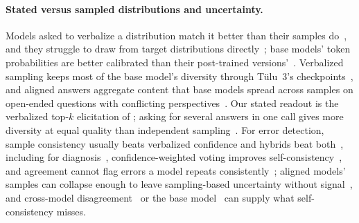 \documentclass[wcp]{jmlr}
\begin{document}
\paragraph{Stated versus sampled distributions and uncertainty.}
Models asked to verbalize a distribution match it better than their samples do~\citep{meister2025distributional,jang2026cannotsample}, and they struggle to draw from target distributions directly~\citep{gu2026illusion,zhao2026dice,zhang2024diffuse}; base models' token probabilities are better calibrated than their post-trained versions'~\citep{kadavath2022know}. Verbalized sampling keeps most of the base model's diversity through Tülu~3's checkpoints~\citep{zhang2025verbalized}, and aligned answers aggregate content that base models spread across samples on open-ended questions with conflicting perspectives~\citep{lake2025overton}. Our stated readout is the verbalized top-$k$ elicitation of \citet{tian2023justask}; asking for several answers in one call gives more diversity at equal quality than independent sampling~\citep{troshin2025asking}. For error detection, sample consistency usually beats verbalized confidence and hybrids beat both~\citep{xiong2024express,lyu2024consistency}, including for diagnosis~\citep{savage2025uncertainty,ren2026medconf}, confidence-weighted voting improves self-consistency~\citep{taubenfeld2025cisc}, and agreement cannot flag errors a model repeats consistently~\citep{tan2025tooconsistent}; aligned models' samples can collapse enough to leave sampling-based uncertainty without signal~\citep{liu2026alignmenttax}, and cross-model disagreement~\citep{hamidieh2026complementing} or the base model~\citep{luo2025pretrained} can supply what self-consistency misses.
\end{document}
